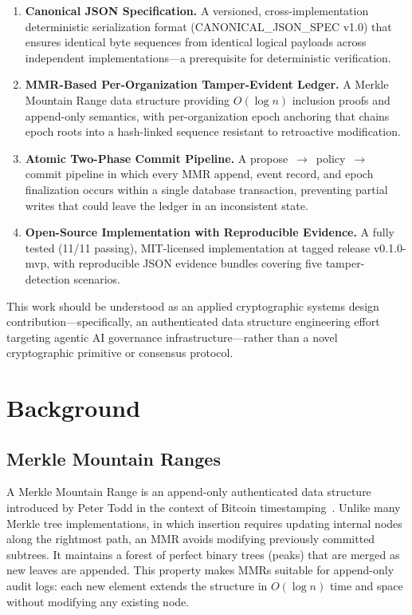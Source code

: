 \documentclass{article}
\begin{document}
\begin{enumerate}
\item \textbf{Canonical JSON Specification.} A versioned, cross-implementation
  deterministic serialization format (CANONICAL\_JSON\_SPEC v1.0) that ensures
  identical byte sequences from identical logical payloads across independent
  implementations---a prerequisite for deterministic verification.

\item \textbf{MMR-Based Per-Organization Tamper-Evident Ledger.} A Merkle
  Mountain Range data structure providing $O(\log n)$ inclusion proofs and
  append-only semantics, with per-organization epoch anchoring that chains
  epoch roots into a hash-linked sequence resistant to retroactive modification.

\item \textbf{Atomic Two-Phase Commit Pipeline.} A propose~$\to$~policy~$\to$
  commit pipeline in which every MMR append, event record, and epoch
  finalization occurs within a single database transaction, preventing partial
  writes that could leave the ledger in an inconsistent state.

\item \textbf{Open-Source Implementation with Reproducible Evidence.} A fully
  tested (11/11 passing), MIT-licensed implementation at tagged release
  v0.1.0-mvp, with reproducible JSON evidence bundles covering five
  tamper-detection scenarios.
\end{enumerate}

\noindent This work should be understood as an applied cryptographic systems
design contribution---specifically, an authenticated data structure engineering
effort targeting agentic AI governance infrastructure---rather than a novel
cryptographic primitive or consensus protocol.

\section{Background}

\subsection{Merkle Mountain Ranges}

A Merkle Mountain Range is an append-only authenticated data structure
introduced by Peter Todd in the context of Bitcoin timestamping~\cite{todd2013}.
Unlike many Merkle tree implementations, in which insertion requires updating
internal nodes along the rightmost path, an MMR avoids modifying previously
committed subtrees. It maintains a forest of perfect binary trees (peaks) that
are merged as new leaves are appended. This property makes MMRs suitable for
append-only audit logs: each new element extends the structure in $O(\log n)$
time and space without modifying any existing node.
\end{document}
